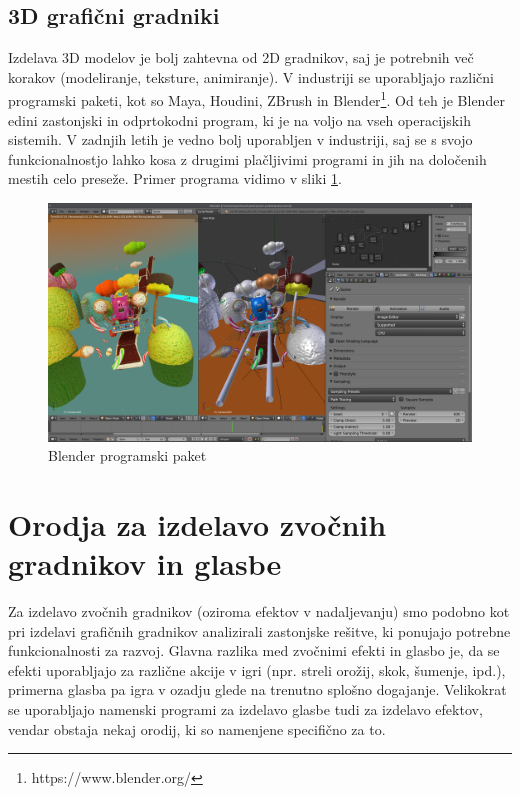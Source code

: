 \documentclass[12pt,a4paper,twoside]{book}
\begin{document}
\subsection{3D grafični gradniki}
Izdelava 3D modelov je bolj zahtevna od 2D gradnikov, saj je potrebnih več korakov (modeliranje, teksture, animiranje). V industriji se uporabljajo različni programski paketi, kot so Maya, Houdini, ZBrush in Blender\footnote{https://www.blender.org/}. Od teh je Blender edini zastonjski in odprtokodni program, ki je na voljo na vseh operacijskih sistemih. V zadnjih letih je vedno bolj uporabljen v industriji, saj se s svojo funkcionalnostjo lahko kosa z drugimi plačljivimi programi in jih na določenih mestih celo preseže. Primer programa vidimo v sliki \ref{slika:blenderDemo}.

\begin{figure}[h]
	\centering
	\includegraphics[width=13cm]{blenderDemo}
	\caption{Blender programski paket}
	\label{slika:blenderDemo}
\end{figure}

\section{Orodja za izdelavo zvočnih gradnikov in glasbe}
Za izdelavo zvočnih gradnikov (oziroma efektov v nadaljevanju) smo podobno kot pri izdelavi grafičnih gradnikov analizirali zastonjske rešitve, ki ponujajo potrebne funkcionalnosti za razvoj. Glavna razlika med zvočnimi efekti in glasbo je, da se efekti uporabljajo za različne akcije v igri (npr. streli orožij, skok, šumenje, ipd.), primerna glasba pa igra v ozadju glede na trenutno splošno dogajanje. Velikokrat se uporabljajo namenski programi za izdelavo glasbe tudi za izdelavo efektov, vendar obstaja nekaj orodij, ki so namenjene specifično za to.
\end{document}
